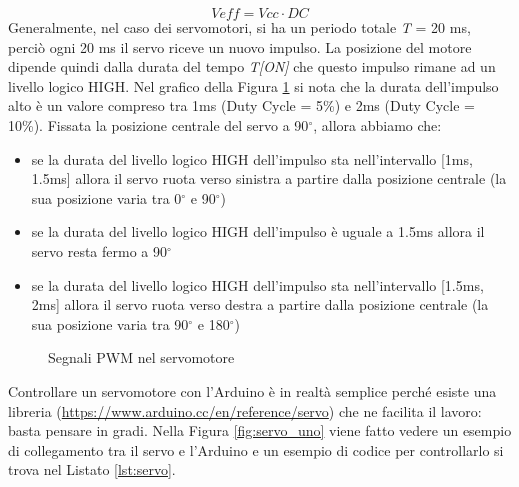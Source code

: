 \documentclass[12pt]{report}
\begin{document}
%
\[Veff = Vcc \cdot DC\]
%
Generalmente, nel caso dei servomotori, si ha un periodo totale \textit{T} = 20 ms, perciò ogni 20 ms il servo riceve un nuovo impulso. La posizione del motore dipende quindi dalla durata del tempo \textit{T[ON]} che questo impulso rimane ad un livello logico HIGH. Nel grafico della Figura \ref{fig:servo_pwm} si nota che la durata dell'impulso alto è un valore compreso tra 1ms (Duty Cycle = 5\%) e 2ms (Duty Cycle = 10\%). Fissata la posizione centrale del servo a 90$^{\circ}$, allora abbiamo che: 


\begin{itemize}
	\item se la durata del livello logico HIGH dell'impulso sta nell'intervallo [1ms, 1.5ms] allora il servo ruota verso sinistra a partire dalla posizione centrale (la sua posizione varia tra 0$^{\circ}$ e 90$^{\circ}$)
	\item se la durata del livello logico HIGH dell'impulso è uguale a 1.5ms allora il servo resta fermo a 90$^{\circ}$
	\item se la durata del livello logico HIGH dell'impulso sta nell'intervallo [1.5ms, 2ms] allora il servo ruota verso destra a partire dalla posizione centrale (la sua posizione varia tra 90$^{\circ}$ e 180$^{\circ}$)
\end{itemize}

\begin{figure}[H]
	\caption{Segnali PWM nel servomotore}
	\label{fig:servo_pwm}
\end{figure}

Controllare un servomotore con l'Arduino è in realtà semplice perché esiste una libreria (\url{https://www.arduino.cc/en/reference/servo}) che ne facilita il lavoro: basta pensare in gradi. Nella Figura \ref{fig:servo_uno} viene fatto vedere un esempio di collegamento tra il servo e l'Arduino e un esempio di codice per controllarlo si trova nel Listato \ref{lst:servo}.
\end{document}
